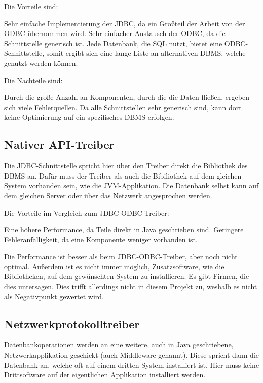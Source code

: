 Die Vorteile sind:

\begin{outline}
  \1 Sehr einfache Implementierung der JDBC, da ein Großteil der Arbeit von
  der ODBC übernommen wird.
  \1 Sehr einfacher Austausch der ODBC, da die Schnittstelle generisch ist.
  \1 Jede Datenbank, die SQL nutzt, bietet eine ODBC-Schnittstelle, somit
  ergibt sich eine lange Liste an alternativen DBMS, welche genutzt werden
  können.
\end{outline}

Die Nachteile sind:

\begin{outline}
  \1 Durch die große Anzahl an Komponenten, durch die die Daten fließen,
  ergeben sich viele Fehlerquellen.
  \1 Da alle Schnittstellen sehr generisch sind, kann dort keine Optimierung
  auf ein spezifisches DBMS erfolgen.
\end{outline}

\subsection{Nativer API-Treiber}
Die JDBC-Schnittstelle spricht hier über den Treiber direkt die Bibliothek
des DBMS an. Dafür muss der Treiber als auch die Bibiliothek auf dem gleichen
System vorhanden sein, wie die JVM-Applikation. Die Datenbank selbst kann auf
dem gleichen Server oder über das Netzwerk angesprochen werden.

Die Vorteile im Vergleich zum JDBC-ODBC-Treiber:
\begin{outline}
  \1 Eine höhere Performance, da Teile direkt in Java geschrieben sind.
  \1 Geringere Fehleranfälligkeit, da eine Komponente weniger vorhanden ist.
\end{outline}

Die Performance ist besser als beim JDBC-ODBC-Treiber, aber noch nicht optimal.
Außerdem ist es nicht immer möglich, Zusatzsoftware, wie die Bibliotheken, auf
dem gewünschten System zu installieren. Es gibt Firmen, die dies untersagen.
Dies trifft allerdings nicht in diesem Projekt zu, weshalb es nicht als
Negativpunkt gewertet wird.

\subsection{Netzwerkprotokolltreiber}
Datenbankoperationen werden an eine weitere, auch in Java geschriebene,
Netzwerkapplikation geschickt (auch \gls{Middleware} genannt). Diese spricht
dann die Datenbank an, welche oft auf einem dritten System installiert ist.
Hier muss keine Drittsoftware auf der eigentlichen Applikation installiert
werden.

